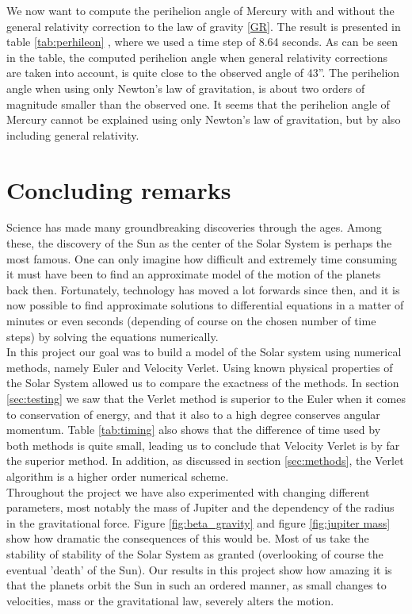 \documentclass[12pt]{article}
\numberwithin{figure}{section}
\numberwithin{table}{section}
\begin{document}
We now want to compute the perihelion angle of Mercury with and without the general relativity correction to the law of gravity \eqref{GR}. The result is presented in table \ref{tab:perhileon} , where we used a time step of 8.64 seconds. As can be seen in the table, the computed perihelion angle when general relativity corrections are taken into account, is quite close to the observed angle of 43''. The perihelion angle when using only Newton's law of gravitation, is about two orders of magnitude smaller than the observed one. It seems that the perihelion angle of Mercury cannot be explained using only Newton's law of gravitation, but by also including general relativity.

\section{Concluding remarks}
\noindent Science has made many groundbreaking discoveries through the ages. Among these, the discovery of the Sun as the center of the Solar System is perhaps the most famous. One can only imagine how difficult and extremely time consuming it must have been to find an approximate model of the motion of the planets back then. Fortunately, technology has moved a lot forwards since then, and it is now possible to find approximate solutions to differential equations in a matter of minutes or even seconds (depending of course on the chosen number of time steps) by solving the equations numerically.\\

\noindent In this project our goal was to build a model of the Solar system using numerical methods, namely Euler and Velocity Verlet. Using known physical properties of the Solar System allowed us to compare the exactness of the methods. In section \ref{sec:testing} we saw that the Verlet method is superior to the Euler when it comes to conservation of energy, and that it also to a high degree conserves angular momentum. Table \eqref{tab:timing} also shows that the difference of time used by both methods is quite small, leading us to conclude that Velocity Verlet is by far the superior method. In addition, as discussed in section \ref{sec:methods}, the Verlet algorithm is a higher order numerical scheme. \\

\noindent Throughout the project we have also experimented with changing different parameters, most notably the mass of Jupiter and the dependency of the radius in the gravitational force. Figure \ref{fig:beta_gravity} and figure \eqref{fig:jupiter mass} show how dramatic the consequences of this would be. Most of us take the stability of stability of the Solar System as granted (overlooking of course the eventual 'death' of the Sun). Our results in this project show how amazing it is that the planets orbit the Sun in such an ordered manner, as small changes to velocities, mass or the gravitational law, severely alters the motion.\\
\end{document}
